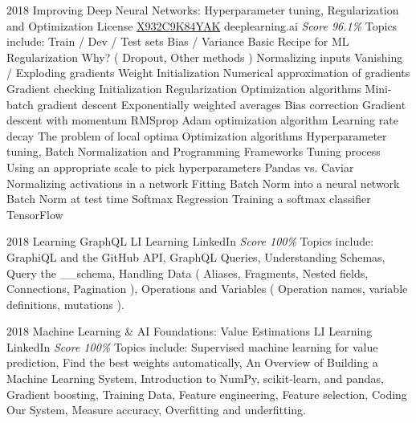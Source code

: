 \documentclass[11pt,a4paper]{moderncv}
\begin{document}
\cventry
    {2018}
    {Improving Deep Neural Networks: Hyperparameter tuning, Regularization and Optimization}
    {License
        \href{https://www.coursera.org/account/accomplishments/records/X932C9K84YAK}
        {X932C9K84YAK}
    }
    {deeplearning.ai}
    {\textit{Score 96.1\%}}
    {
        Topics include:
            Train / Dev / Test sets
            Bias / Variance
            Basic Recipe for ML
            Regularization
            Why? (
                Dropout,
                Other methods
                )
            Normalizing inputs
            Vanishing / Exploding gradients
            Weight Initialization
            Numerical approximation of gradients
            Gradient checking
            Initialization
            Regularization
            Optimization algorithms
            Mini-batch gradient descent
            Exponentially weighted averages
            Bias correction
            Gradient descent with momentum
            RMSprop
            Adam optimization algorithm
            Learning rate decay
            The problem of local optima
            Optimization algorithms
            Hyperparameter tuning, Batch Normalization and Programming Frameworks
            Tuning process
            Using an appropriate scale to pick hyperparameters
            Pandas vs. Caviar
            Normalizing activations in a network
            Fitting Batch Norm into a neural network
            Batch Norm at test time
            Softmax Regression
            Training a softmax classifier
            TensorFlow
    }

\cventry
    {2018}
    {Learning GraphQL}
    {LI Learning}
    {LinkedIn}
    {\textit{Score 100\%}}
    {
        Topics include:
            GraphiQL and the GitHub API,
            GraphQL Queries,
            Understanding Schemas,
            Query the \_\_schema,
            Handling Data (
                Aliases,
                Fragments,
                Nested fields,
                Connections,
                Pagination
            ),
            Operations and Variables (
                Operation names,
                variable definitions,
                mutations
            ).
    }

\cventry
    {2018}
    {Machine Learning \& AI Foundations: Value Estimations}
    {LI Learning}
    {LinkedIn}
    {\textit{Score 100\%}}
    {
        Topics include:
            Supervised machine learning for value prediction,
            Find the best weights automatically,
            An Overview of Building a Machine Learning System,
            Introduction to NumPy, scikit-learn, and pandas,
            Gradient boosting,
            Training Data,
            Feature engineering,
            Feature selection,
            Coding Our System,
            Measure accuracy,
            Overfitting and underfitting.
    }
\end{document}
